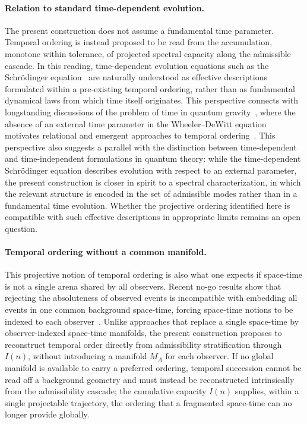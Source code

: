 \documentclass[11pt,a4paper]{article}
\begin{document}
  \paragraph{Relation to standard time-dependent evolution.}
    The present construction does not assume a fundamental time parameter.
    Temporal ordering is instead proposed to be read from the accumulation, monotone within tolerance, of
    projected spectral capacity along the admissible cascade.
    In this reading, time-dependent evolution equations such as the
    Schrödinger equation~\cite{Schrodinger1926} are naturally understood
    as effective descriptions formulated within a pre-existing temporal
    ordering, rather than as fundamental dynamical laws from which time
    itself originates.
    This perspective connects with longstanding discussions of the problem
    of time in quantum gravity~\cite{Isham1993,Anderson2012}, where the
    absence of an external time parameter in the Wheeler--DeWitt
    equation~\cite{Wheeler1967} motivates relational and emergent
    approaches to temporal
    ordering~\cite{PageWootters1983,Rovelli1991,Connes1994}.
    This perspective also suggests a parallel with the distinction between
    time-dependent and time-independent formulations in quantum theory:
    while the time-dependent Schrödinger equation describes evolution with
    respect to an external parameter, the present construction is closer in
    spirit to a spectral characterization, in which the relevant structure
    is encoded in the set of admissible modes rather than in a fundamental
    time evolution.
    Whether the projective ordering identified here is compatible with such
    effective descriptions in appropriate limits remains an open question.

  \paragraph{Temporal ordering without a common manifold.}
    This projective notion of temporal ordering is also what one expects if space-time is not a single
    arena shared by all observers.
    Recent no-go results show that rejecting the absoluteness of observed events is incompatible with
    embedding all events in one common background space-time, forcing space-time notions to be indexed to
    each observer~\cite{Pienaar2026}.
    Unlike approaches that replace a single space-time by observer-indexed space-time manifolds, the
    present construction proposes to reconstruct temporal order directly from admissibility stratification through
    $I(n)$, without introducing a manifold $M_A$ for each observer.
    If no global manifold is available to carry a preferred ordering, temporal succession cannot be read
    off a background geometry and must instead be reconstructed intrinsically from the admissibility
    cascade; the cumulative capacity $I(n)$ supplies, within a single projectable trajectory, the ordering
    that a fragmented space-time can no longer provide globally.
\end{document}
